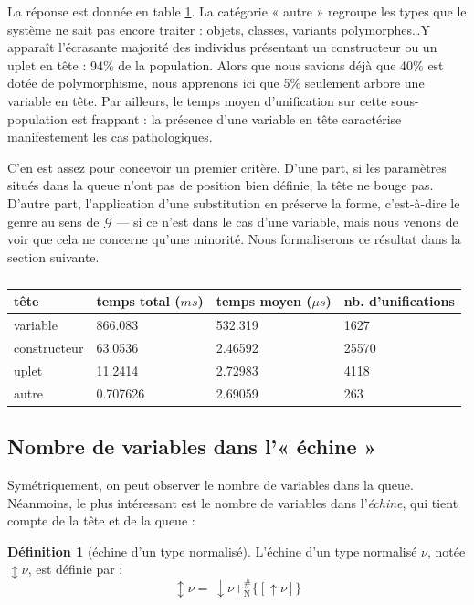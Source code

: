 \documentclass[a4paper]{report}
\theoremstyle{definition}
\newtheorem{definition}[theoreme]{Définition}
\newcommand{\mset}[1]{\{\![#1]\!\}}
\newcommand{\G}{\mathscr{G}}
\newcommand{\N}{\mathrm{N}}
\begin{document}
La réponse est donnée en table \ref{tab_meas2}. La catégorie « autre » regroupe les types que le système ne sait pas encore traiter : objets, classes, variants polymorphes\dots Y apparaît l'écrasante majorité des individus présentant un constructeur ou un uplet en tête : 94\% de la population. Alors que nous savions déjà que 40\% est dotée de polymorphisme, nous apprenons ici que 5\% seulement arbore une variable en tête. Par ailleurs, le temps moyen d'unification sur cette sous-population est frappant : la présence d'une variable en tête caractérise manifestement les cas pathologiques.

C'en est assez pour concevoir un premier critère. D'une part, si les paramètres situés dans la queue n'ont pas de position bien définie, la tête ne bouge pas. D'autre part, l'application d'une substitution en préserve la forme, c'est-à-dire le genre au sens de $\G$ — si ce n'est dans le cas d'une variable, mais nous venons de voir que cela ne concerne qu'une minorité. Nous formaliserons ce résultat dans la section suivante.

\begin{table}[h]
  \centering
  \begin{tabular}{|l|l|l|l|}
    \hline
      tête &
      temps total ($ms$) &
      temps moyen ($\mu s$) &
      nb. d'unifications
    \\
    \hline
      variable & 866.083 & 532.319 & 1627
    \\
      constructeur & 63.0536 & 2.46592 & 25570
    \\
      uplet & 11.2414 & 2.72983 & 4118
    \\
      autre & 0.707626 & 2.69059 & 263
    \\
    \hline
  \end{tabular}
  \caption{\label{tab_meas2}}
\end{table}


\subsection{Nombre de variables dans l'« échine »}

Symétriquement, on peut observer le nombre de variables dans la queue. Néanmoins, le plus intéressant est le nombre de variables dans l'\emph{échine}, qui tient compte de la tête et de la queue :

\begin{definition}[échine d'un type normalisé]
  L'échine d'un type normalisé $\nu$, notée $\updownarrow \nu$, est définie par :
  \[ \updownarrow \nu =\ \downarrow \nu +^\#_\N \mset{\uparrow \nu} \]
\end{definition}
\end{document}
